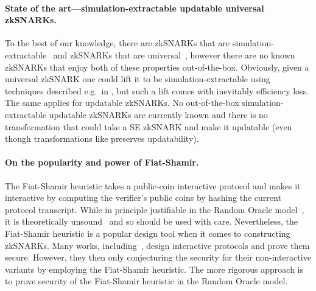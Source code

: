 \documentclass[runningheads,11pt]{llncs}
\theoremstyle{definition} \newtheorem{definition}[theorem]{Definition}
\begin{document}
\paragraph{State of the art---simulation-extractable updatable universal zkSNARKs.} 
To the best of our knowledge, there are zkSNARKs that are simulation-extractable~\cite{C:GroMal17,EPRINT:BowGab18,EPRINT:AtaBag19,EC:Groth16}
and zkSNARKs that are universal~\cite{C:GKMMM18,CCS:MBKM19,EPRINT:GabWilCio19,EC:CHMMVW20}, however there are no known zkSNARKs that enjoy
both of these properties out-of-the-box. Obviously, given a universal zkSNARK
one could lift it to be simulation-extractable using techniques described
e.g.~in \cite{EPRINT:KZMQCP15,CCS:AbdRamSla20}, but such a lift comes with
inevitably efficiency loss.  
The same applies for updatable zkSNARKs. No out-of-the-box
simulation-extractable updatable zkSNARKs are
currently known and there is no transformation that could take a SE zkSNARK
and make it updatable (even though transformations like \cite{CCS:AbdRamSla20}
preserves updatability).

\paragraph{On the popularity and power of Fiat-Shamir.} The Fiat-Shamir heuristic takes a public-coin interactive protocol and makes it interactive by computing the verifier's public coins by hashing the current protocol transcript. While in principle justifiable in the Random Oracle model~\cite{CCS:BelRog93}, it is theoretically unsound~\cite{FOCS:GolKal03} and so should be used with care. 
Nevertheless, the Fiat-Shamir heuristic is a popular design tool when it comes to constructing zkSNARKs. Many works, including~\cite{CCS:MBKM19,EPRINT:GabWilCio19,EC:CHMMVW20}, design interactive protocols and prove them secure. However, they then only conjecturing the security for their non-interactive variants by employing the Fiat-Shamir heuristic. The more rigorous approach is to prove security of the Fiat-Shamir heuristic in the Random Oracle model.
\end{document}
